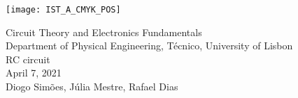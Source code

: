 
\thispagestyle {empty}

\texttt{[image: IST\_A\_CMYK\_POS]}

\begin{center}
%
\vspace{1.0cm}

\vspace{1cm}
{\FontLb Circuit Theory and Electronics Fundamentals} \\ %
\vspace{1cm}
{\FontSn Department of Physical Engineering, Técnico, University of Lisbon} \\ %
\vspace{1cm}
{\FontSn RC circuit } \\
\vspace{1cm}
{\FontSn April 7, 2021} \\ %
{\FontSn Diogo Simões, Júlia Mestre, Rafael Dias}
\end{center}

